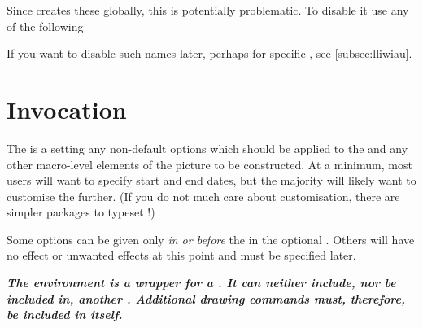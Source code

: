 \documentclass[10pt,british,a4paper]{ltxdoc}
\newcommand*\pkg[1]{\textpkg{#1}}
\newlength\tewadjust
\begin{document}
Since \pkg{chronos} creates these  globally, this is potentially problematic.
To disable it use any of the following
\begin{chronoscode}
\usepackage[no simple colour names]{chronos}
\usepackage[no simple colour names=true]{chronos}
\usepackage[simple colour names=false]{chronos}
\end{chronoscode}

If you want to disable such names later, perhaps for specific , see \cref{subsec:lliwiau}.


\section{Invocation}\label{sec:invoke}
\AfterLastParam
The  is a  setting any non-default options which should be applied to the  and any other macro-level elements of the picture to be constructed.
At a minimum, most users will want to specify start and end dates, but the majority will likely want to customise the  further.
(If you do not much care about customisation, there are simpler packages to typeset !)

Some options can be given only \emph{in or before} the  in the optional .
Others will have no effect or unwanted effects at this point and must be specified later.

{\em
  {\bfseries
    The environment  is a wrapper for a .
    It can neither include, nor be included in, another .
    Additional drawing commands must, therefore, be included in  itself.%
  }%
}


\setlength\tewadjust{\marginparwidth+\marginparsep}%
\fancyheadoffset[lh]{0pt}%
\end{document}
